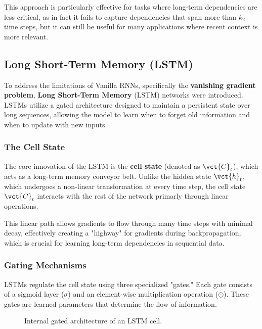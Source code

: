 This approach is particularly effective for tasks where long-term dependencies are less critical, as in fact
it fails to capture dependencies that span more than $k_2$ time steps, but it can still be useful for many applications where recent context is more relevant.

\subsection{Long Short-Term Memory (LSTM)}
To address the limitations of Vanilla RNNs, specifically the \textbf{vanishing gradient problem}, \textbf{Long Short-Term Memory} (LSTM)
networks were introduced. LSTMs utilize a gated architecture designed to maintain a persistent state over long sequences,
allowing the model to learn when to forget old information and when to update with new inputs.

\subsubsection{The Cell State}
The core innovation of the LSTM is the \textbf{cell state} (denoted as $\vct{C}_t$), which acts as a long-term memory conveyor belt.
Unlike the hidden state $\vct{h}_t$, which undergoes a non-linear transformation at every time step, the cell state $\vct{C}_t$
interacts with the rest of the network primarly through linear operations.

This linear path allows gradients to flow through many time steps with minimal decay,
effectively creating a "highway" for gradients during backpropagation, which is crucial for learning long-term dependencies in sequential data.

\subsubsection{Gating Mechanisms}
LSTMs regulate the cell state using three specialized "gates."
Each gate consists of a sigmoid layer ($\sigma$) and an element-wise multiplication operation ($\odot$).
These gates are learned parameters that determine the flow of information.

\begin{figure}[H]
    \centering
    \resizebox{.8\textwidth}{!}{
        
    }
    \caption{Internal gated architecture of an LSTM cell.}
\end{figure}

